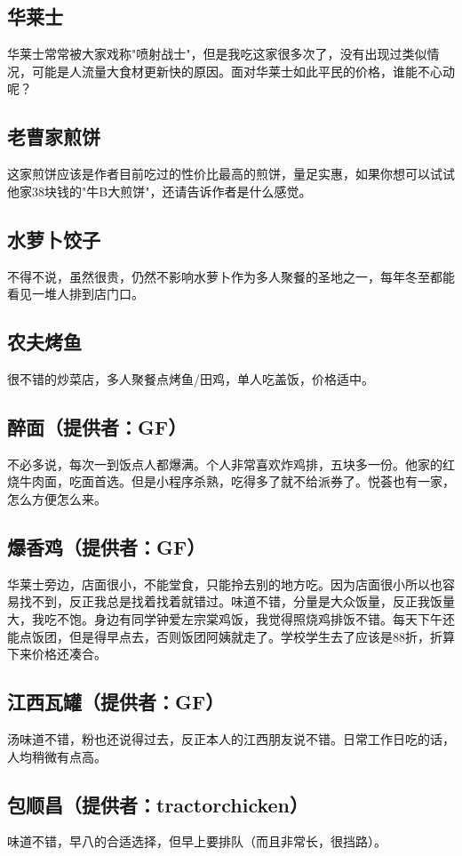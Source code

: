 \documentclass[lang=cn,color=blue,12pt,scheme=chinese,chinesefont=nofont]{elegantbook}
\begin{document}
\subsection{华莱士}
华莱士常常被大家戏称"喷射战士"，但是我吃这家很多次了，没有出现过类似情况，可能是人流量大食材更新快的原因。面对华莱士如此平民的价格，谁能不心动呢？

\subsection{老曹家煎饼}
这家煎饼应该是作者目前吃过的性价比最高的煎饼，量足实惠，如果你想可以试试他家38块钱的"牛B大煎饼"，还请告诉作者是什么感觉。

\subsection{水萝卜饺子}
不得不说，虽然很贵，仍然不影响水萝卜作为多人聚餐的圣地之一，每年冬至都能看见一堆人排到店门口。

\subsection{农夫烤鱼}
很不错的炒菜店，多人聚餐点烤鱼/田鸡，单人吃盖饭，价格适中。

\subsection{醉面（提供者：GF）}
不必多说，每次一到饭点人都爆满。个人非常喜欢炸鸡排，五块多一份。他家的红烧牛肉面，吃面首选。但是小程序杀熟，吃得多了就不给派券了。悦荟也有一家，怎么方便怎么来。

\subsection{爆香鸡（提供者：GF）}
华莱士旁边，店面很小，不能堂食，只能拎去别的地方吃。因为店面很小所以也容易找不到，反正我总是找着找着就错过。味道不错，分量是大众饭量，反正我饭量大，我吃不饱。身边有同学钟爱左宗棠鸡饭，我觉得照烧鸡排饭不错。每天下午还能点饭团，但是得早点去，否则饭团阿姨就走了。学校学生去了应该是88折，折算下来价格还凑合。

\subsection{江西瓦罐（提供者：GF）}
汤味道不错，粉也还说得过去，反正本人的江西朋友说不错。日常工作日吃的话，人均稍微有点高。

\subsection{包顺昌（提供者：tractorchicken）}
味道不错，早八的合适选择，但早上要排队（而且非常长，很挡路）。
\end{document}
